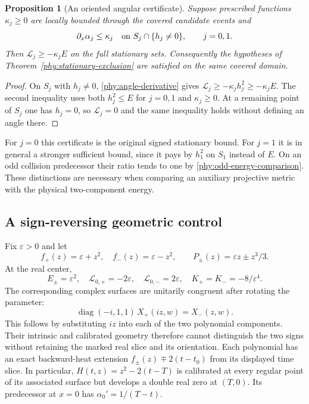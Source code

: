 \documentclass[11pt]{article}
\numberwithin{equation}{section}
\newtheorem{proposition}[theorem]{Proposition}
\theoremstyle{definition}
\theoremstyle{remark}
\begin{document}
\begin{proposition}[An oriented angular certificate]
\label{phy:angular-certificate}
Suppose prescribed functions $\kappa_j\ge0$ are locally bounded through
the covered candidate events and
\[
 \partial_x\alpha_j\le\kappa_j
 \quad\hbox{on }S_j\cap\{h_j\ne0\},\qquad j=0,1.
\]
Then $\mathcal L_j\ge-\kappa_jE$ on the full stationary sets.
Consequently the hypotheses of Theorem~\ref{phy:stationary-exclusion}
are satisfied on the same covered domain.
\end{proposition}
\begin{proof}
On $S_j$ with $h_j\ne0$, \eqref{phy:angle-derivative} gives
$\mathcal L_j\ge-\kappa_jh_j^2\ge-\kappa_jE$.
The second inequality uses both $h_j^2\le E$ for $j=0,1$ and
$\kappa_j\ge0$.  At a remaining point of $S_j$ one has $h_j=0$,
so $\mathcal L_j=0$ and the same inequality holds without defining an
angle there.
\end{proof}

For $j=0$ this certificate is the original signed stationary bound.
For $j=1$ it is in general a stronger sufficient bound, since it pays by
$h_1^2$ on $S_1$ instead of $E$.  On an odd collision predecessor their
ratio tends to one by \eqref{phy:odd-energy-comparison}.  These distinctions
are necessary when comparing an auxiliary projective metric with the
physical two-component energy.

\subsection{A sign-reversing geometric control}

Fix $\varepsilon>0$ and let
\[
 f_+(z)=\varepsilon+z^2,\quad f_-(z)=\varepsilon-z^2,
 \qquad P_\pm(z)=\varepsilon z\pm z^3/3.
\]
At the real center,
\begin{equation}
 E_\pm=\varepsilon^2,\quad
 \mathcal L_{0,+}=-2\varepsilon,\quad
 \mathcal L_{0,-}=2\varepsilon,\quad
 K_+=K_-=-8/\varepsilon^4.
 \label{phy:opposite-sign-control}
\end{equation}
The corresponding complex surfaces are unitarily congruent after rotating
the parameter:
\begin{equation}
 \operatorname{diag}(-i,1,1)\,X_+(iz,w)=X_-(z,w).
 \label{phy:unitary-congruence}
\end{equation}
This follows by substituting $iz$ into each of the two polynomial
components.  Their intrinsic and calibrated geometry therefore cannot
distinguish the two signs without retaining the marked real slice and
its orientation.  Each polynomial has an exact backward-heat extension
$f_\pm(z)\mp2(t-t_0)$ from its displayed time slice.
In particular, $H(t,z)=z^2-2(t-T)$ is calibrated at every regular point
of its associated surface but develops a double real zero at $(T,0)$.
Its predecessor at $x=0$ has $\alpha_0'=1/(T-t)$.
\end{document}
